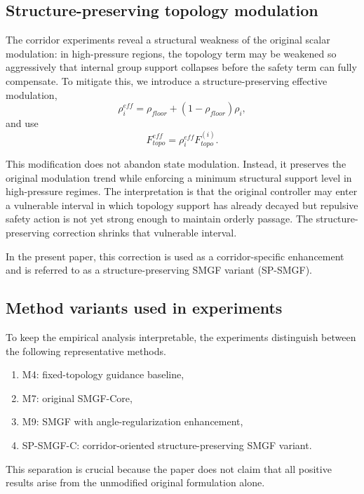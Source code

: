 \documentclass[utf8]{FrontiersinHarvard}
\begin{document}
\subsection{Structure-preserving topology modulation}

The corridor experiments reveal a structural weakness of the original scalar modulation: in high-pressure regions, the topology term may be weakened so aggressively that internal group support collapses before the safety term can fully compensate. To mitigate this, we introduce a structure-preserving effective modulation,
\begin{equation}
\rho_i^{eff} = \rho_{floor} + (1 - \rho_{floor}) \rho_i,
\end{equation}
and use
\begin{equation}
F_{topo}^{eff} = \rho_i^{eff} F_{topo}^{(i)}.
\end{equation}

This modification does not abandon state modulation. Instead, it preserves the original modulation trend while enforcing a minimum structural support level in high-pressure regimes. The interpretation is that the original controller may enter a vulnerable interval in which topology support has already decayed but repulsive safety action is not yet strong enough to maintain orderly passage. The structure-preserving correction shrinks that vulnerable interval.

In the present paper, this correction is used as a corridor-specific enhancement and is referred to as a structure-preserving SMGF variant (SP-SMGF).

\subsection{Method variants used in experiments}

To keep the empirical analysis interpretable, the experiments distinguish between the following representative methods.

\begin{enumerate}
    \item M4: fixed-topology guidance baseline,
    \item M7: original SMGF-Core,
    \item M9: SMGF with angle-regularization enhancement,
    \item SP-SMGF-C: corridor-oriented structure-preserving SMGF variant.
\end{enumerate}

This separation is crucial because the paper does not claim that all positive results arise from the unmodified original formulation alone.
\end{document}
